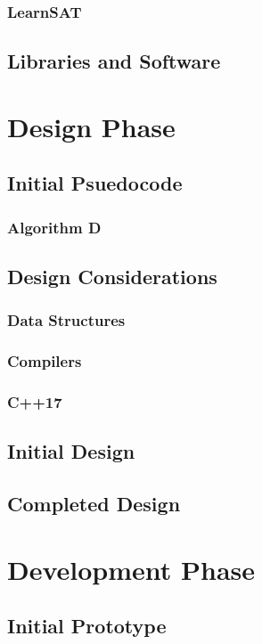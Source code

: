 \documentclass{article}
\begin{document}
\subsubsection{LearnSAT}

\subsection{Libraries and Software}

\newpage
\section{Design Phase}
\subsection{Initial Psuedocode}
\subsubsection{Algorithm D}

\subsection{Design Considerations}
\subsubsection{Data Structures}
\subsubsection{Compilers}
\subsubsection{C++17}

\subsection{Initial Design}
\subsection{Completed Design}

\newpage
\section{Development Phase}
\subsection{Initial Prototype}
\end{document}
